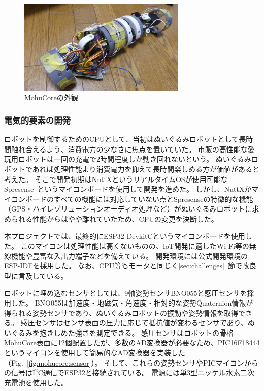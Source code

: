 \documentclass[uplatex,a4paper,12pt]{jsarticle}
\renewcommand{\figurename}{Fig.}
\newcommand{\figref}[1]{\figurename~\ref{#1}}
\begin{document}
\begin{figure}[htbp]
  \centering
  \includegraphics[width=8cm]{images/mohucore/skeleton.jpg}
  \caption{MohuCoreの外観}
  \label{fig:mohucore:skeleton}
\end{figure}

\subsubsection{電気的要素の開発}
ロボットを制御するためのCPUとして、当初はぬいぐるみロボットとして長時間触れ合えるよう、消費電力の少なさに焦点を置いていた。
市販の高性能な愛玩用ロボットは一回の充電で2時間程度しか動き回れないという。
ぬいぐるみロボットであれば処理性能より消費電力を抑えて長時間楽しめる方が価値があると考えた。
そこで開発初期はNuttXというリアルタイムOSが使用可能なSpresense~\cite{web_spresense}というマイコンボードを使用して開発を進めた。
しかし、NuttXがマイコンボードのすべての機能には対応していない点とSpresenseの特徴的な機能（GPS・ハイレゾリューションオーディオ処理など）がぬいぐるみロボットに求められる性能からはやや離れていたため、CPUの変更を決断した。

本プロジェクトでは、最終的にESP32-DevkitCというマイコンボードを使用した。
このマイコンは処理性能は高くないものの、IoT開発に適したWi-Fi等の無線機能や豊富な入出力端子などを備えている。
開発環境には公式開発環境のESP-IDFを採用した。
なお、CPU等もモータと同じく\ref{sec:challenges}~節で改良型に言及している。

ロボットに埋め込むセンサとしては、9軸姿勢センサBNO055と感圧センサを採用した。
BNO055は加速度・地磁気・角速度・相対的な姿勢Quaternion情報が得られる姿勢センサであり、ぬいぐるみロボットの振動や姿勢情報を取得できる。
感圧センサはセンサ表面の圧力に応じて抵抗値が変わるセンサであり、ぬいぐるみを抱きしめた強さを測定できる。
感圧センサはロボットの骨格MohuCore表面に12個配置したが、多数のAD変換器が必要なため、PIC16F18444というマイコンを使用して簡易的なAD変換器を実装した（\figref{fig:mohucore:sensor}）。
そして、これらの姿勢センサやPICマイコンからの信号は\(\mathrm{I^2C}\)通信でESP32と接続されている。
電源には単3型ニッケル水素二次充電池を使用した。
\end{document}
